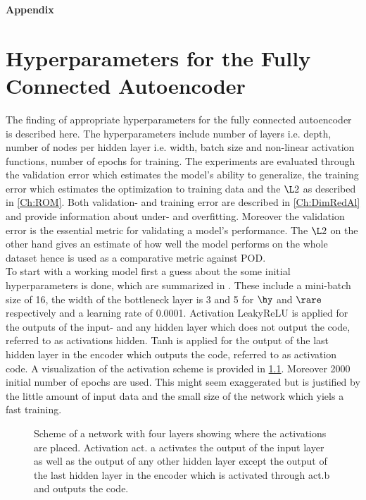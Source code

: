 

\begin{center}
	{\sffamily \bfseries\Large Appendix}\\
\end{center}%
\vspace{1cm}
\chapter{Hyperparameters for the Fully Connected Autoencoder}
\label{Ch:ApA}

The finding of appropriate hyperparameters for the fully connected autoencoder is described here. The hyperparameters include number of layers i.e. depth, number of nodes per hidden layer i.e. width, batch size and non-linear activation functions, number of epochs for training. The experiments are evaluated through the validation error which estimates the model's ability to generalize, the training error which estimates the optimization to training data and the $\L2$ as described in \cref{Ch:ROM}. Both validation- and training error are described in \cref{Ch:DimRedAl} and provide information about under- and overfitting. Moreover the validation error is the essential metric for validating a model's performance. The $\L2$ on the other hand gives an estimate of how well the model performs on the whole dataset hence is used as a comparative metric against POD.\\ 
To start with a working model first a guess about the some initial hyperparameters is done, which are summarized in . These include a mini-batch size of 16, the width of the bottleneck layer is 3 and 5  for \(\hy\) and \(\rare\) respectively and a learning rate of 0.0001. Activation LeakyReLU is applied for the outputs of the input- and  any hidden layer which does not output the code, referred to as activations hidden. Tanh is applied for the output of the last hidden layer in the encoder which outputs the code, referred to as activation code. A visualization of the activation scheme is provided in \cref{Fig:ActScheme}. Moreover 2000 initial number of epochs are used. This might seem exaggerated but is justified by the little amount of input data and the small size of the network which yiels a fast training.
\begin{center}
	\begin{figure}[H]
		\centering
		
		\caption{\footnotesize Scheme of a network with four layers showing where the activations are placed. Activation act. a activates the output of the input layer as well as the output of any other hidden layer except the output of the last hidden layer in the encoder which is activated through act.b and outputs the code.}
		\label{Fig:ActScheme}
		\end{figure}
\end{center}
